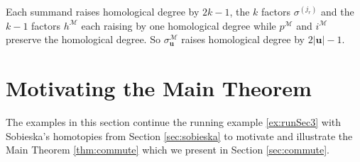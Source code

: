 \documentclass[12pt]{amsart}
\theoremstyle{plain}
\theoremstyle{definition}
\newcommand{\M}{\mathcal{M}}
\begin{document}
  Each summand raises homological degree by $2k - 1$, the $k$ factors $\sigma^{(j_r)}$ and the $k - 1$ factors $h^{\M}$ each raising by one homological degree while $p^{\M}$ and $i^{\M}$ preserve the homological degree. So $\sigma^{\M}_{\boldsymbol{u}}$ raises homological degree by $2|\boldsymbol{u}| - 1$.

\section{Motivating the Main Theorem} \label{sec:examples}

The examples in this section continue the running example \ref{ex:runSec3} with Sobieska's homotopies from Section \ref{sec:sobieska} to motivate and illustrate the Main Theorem \ref{thm:commute} which we present in Section \ref{sec:commute}.
\end{document}
